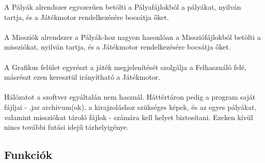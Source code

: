 A Pályák alrendszer egyszerűen betölti a Pályafájlokból a pályákat, nyilván tartja, és a Játékmotor rendelkezésére bocsátja őket. \\ \\
A Missziók alrendszer a Pályák-hoz nagyon hasonlóan a Missziófájlokból betölti a missziókat, nyilván tartja, és a Játékmotor rendelkezésére bocsátja őket. \\ \\
A Grafikus felület egyrészt a játék megjelenítését szolgálja a Felhasználó felé, másrészt ezen keresztül irányítható a Játékmotor. \\ \\
Hálózatot a szoftver egyáltalán nem használ. Háttértáron pedig a program saját fájljai - .jar archivum(ok), a kirajzoláshoz szükséges képek, és az egyes pályákat, valamint missziókat tároló fájlok - számára kell helyet biztosítani. Ezeken kívül nincs további futási idejű tárhelyigénye.

\subsection{Funkciók}

